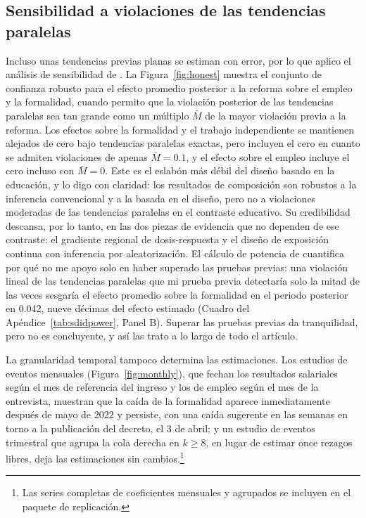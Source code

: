 \subsection{Sensibilidad a violaciones de las tendencias paralelas}

Incluso unas tendencias previas planas se estiman con error, por lo que aplico el análisis de sensibilidad de \citet{rambachan_roth_2023}. La Figura~\ref{fig:honest} muestra el conjunto de confianza robusto para el efecto promedio posterior a la reforma sobre el empleo y la formalidad, cuando permito que la violación posterior de las tendencias paralelas sea tan grande como un múltiplo $\bar{M}$ de la mayor violación previa a la reforma. Los efectos sobre la formalidad y el trabajo independiente se mantienen alejados de cero bajo tendencias paralelas exactas, pero incluyen el cero en cuanto se admiten violaciones de apenas $\bar{M}=0.1$, y el efecto sobre el empleo incluye el cero incluso con $\bar{M}=0$. Este es el eslabón más débil del diseño basado en la educación, y lo digo con claridad: los resultados de composición son robustos a la inferencia convencional y a la basada en el diseño, pero no a violaciones moderadas de las tendencias paralelas en el contraste educativo. Su credibilidad descansa, por lo tanto, en las dos piezas de evidencia que no dependen de ese contraste: el gradiente regional de dosis-respuesta y el diseño de exposición continua con inferencia por aleatorización. El cálculo de potencia de \citet{roth_2022_pretest} cuantifica por qué no me apoyo solo en haber superado las pruebas previas: una violación lineal de las tendencias paralelas que mi prueba previa detectaría solo la mitad de las veces sesgaría el efecto promedio sobre la formalidad en el periodo posterior en 0.042, nueve décimas del efecto estimado (Cuadro del Apéndice~\ref{tab:sdidpower}, Panel B). Superar las pruebas previas da tranquilidad, pero no es concluyente, y así las trato a lo largo de todo el artículo.

La granularidad temporal tampoco determina las estimaciones. Los estudios de eventos mensuales (Figura~\ref{fig:monthly}), que fechan los resultados salariales según el mes de referencia del ingreso y los de empleo según el mes de la entrevista, muestran que la caída de la formalidad aparece inmediatamente después de mayo de 2022 y persiste, con una caída sugerente en las semanas en torno a la publicación del decreto, el 3 de abril; y un estudio de eventos trimestral que agrupa la cola derecha en $k\ge 8$, en lugar de estimar once rezagos libres, deja las estimaciones sin cambios.\footnote{Las series completas de coeficientes mensuales y agrupados se incluyen en el paquete de replicación.}

